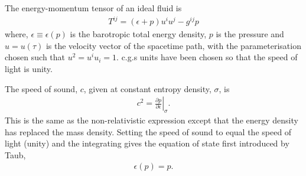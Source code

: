 \documentclass[10pt, fleqn,final,showtrims,oldfontcommands]{article} %
\newcommand{\eqal}[2]{\begin{align}#1\label{eqn:#2}\end{align}}
\newcommand{\eqnref}[1]{\ref{eqn:#1}}
\newcommand{\epsillon}{\epsilon}
\renewcommand{\d}{\partial}
\newcommand{\given}[2]{ \left.{#1}\right|_{#2}  }
\begin{document}
The energy-momentum tensor of an ideal fluid is\cite{Doran2003}
\eqal{
  T^{i j} = (\epsilon + p) u^i u^j - g^{i j} p
}{EMtensor}
where, $\epsilon \equiv \epsilon(p)$ is the barotropic total energy density,
$p$ is the pressure
and 
$u=u(\tau)$ is the velocity vector of the spacetime path, with the parameterisation chosen such that $u^2 = u^i u_i = 1$. %
c.g.s units have been chosen  so that the speed of light is unity.

The speed of sound, $c$,  given at constant entropy density, $\sigma$, is\cite{LandauBook,Taub1978} 
\begin{align}
  c^2 = \given{\frac{\d p}{\d \epsillon}}{\sigma}. \label{eqn:soundspeed}
\end{align}
This is the same as the non-relativistic expression except that the energy density has replaced the mass density.
Setting the speed of sound to equal the speed of light (unity) and the integrating 
 gives
 the equation of state first introduced by Taub\cite{Taub1978},
\eqal{
  \epsilon(p) = p.
}{eos}

\end{document}
